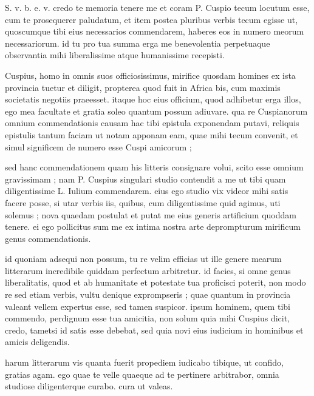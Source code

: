 


 S. v. b. e. v. credo te memoria tenere me et coram P. Cuspio tecum locutum esse, cum te prosequerer paludatum, et item postea pluribus verbis tecum egisse ut, quoscumque tibi eius necessarios commendarem, haberes eos in numero meorum necessariorum. id tu pro tua summa erga me benevolentia perpetuaque observantia mihi liberalissime atque humanissime recepisti.

 Cuspius, homo in omnis suos officiosissimus, mirifice quosdam homines ex ista provincia tuetur et diligit, propterea quod fuit in Africa bis, cum maximis societatis negotiis praeesset. itaque hoc eius officium, quod adhibetur erga illos, ego mea facultate et gratia soleo quantum possum adiuvare. qua re Cuspianorum omnium commendationis causam hac tibi epistula exponendam putavi, reliquis epistulis tantum faciam ut notam apponam eam, quae mihi tecum convenit, et simul significem de numero esse Cuspi amicorum ;

 sed hanc commendationem quam his litteris consignare volui, scito esse omnium gravissimam ; nam P. Cuspius singulari studio contendit a me ut tibi quam diligentissime L. Iulium commendarem. eius ego studio vix videor mihi satis facere posse, si utar verbis iis, quibus, cum diligentissime quid agimus, uti solemus ; nova quaedam postulat et putat me eius generis artificium quoddam tenere. ei ego pollicitus sum me ex intima nostra arte deprompturum mirificum genus commendationis.

 id quoniam adsequi non possum, tu re velim efficias ut ille genere mearum litterarum incredibile quiddam perfectum arbitretur. id facies, si omne genus liberalitatis, quod et ab humanitate et potestate tua proficisci poterit, non modo re sed etiam verbis, vultu denique exprompseris ; quae quantum in provincia valeant vellem expertus esse, sed tamen suspicor. ipsum hominem, quem tibi commendo, perdignum esse tua amicitia, non solum quia mihi Cuspius dicit, credo, tametsi id satis esse debebat, sed quia novi eius iudicium in hominibus et amicis deligendis.

 harum litterarum vis quanta fuerit propediem iudicabo tibique, ut confido, gratias agam. ego quae te velle quaeque ad te pertinere arbitrabor, omnia studiose diligenterque curabo. cura ut valeas.
